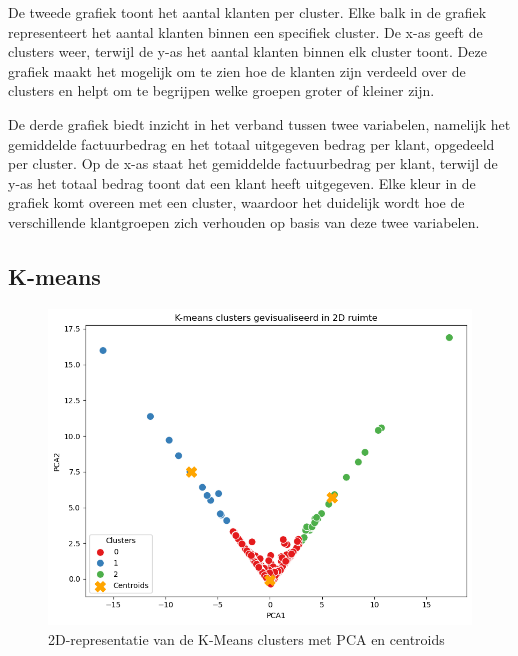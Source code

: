 \vspace{1em}

De tweede grafiek toont het aantal klanten per cluster. Elke balk in de grafiek representeert het aantal klanten binnen een specifiek cluster. De x-as geeft de clusters weer, terwijl de y-as het aantal klanten binnen elk cluster toont. Deze grafiek maakt het mogelijk om te zien hoe de klanten zijn verdeeld over de clusters en helpt om te begrijpen welke groepen groter of kleiner zijn.

\vspace{1em}

De derde grafiek biedt inzicht in het verband tussen twee variabelen, namelijk het gemiddelde factuurbedrag en het totaal uitgegeven bedrag per klant, opgedeeld per cluster. Op de x-as staat het gemiddelde factuurbedrag per klant, terwijl de y-as het totaal bedrag toont dat een klant heeft uitgegeven. Elke kleur in de grafiek komt overeen met een cluster, waardoor het duidelijk wordt hoe de verschillende klantgroepen zich verhouden op basis van deze twee variabelen.


\subsection*{K-means}

\begin{figure}[H]
    \centering
    \includegraphics[width=0.8\linewidth]{images/Kmeans/2DrepresentatieKmeans}
    \caption{2D-representatie van de K-Means clusters met PCA en centroids}
    \label{fig:PCA_KMeans}
\end{figure}


